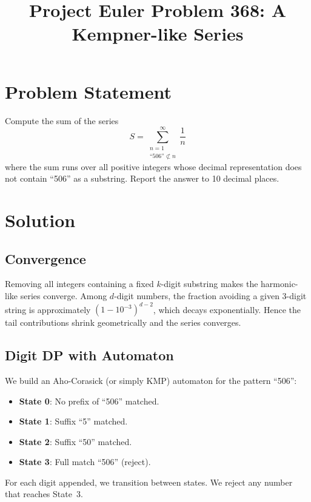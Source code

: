 \documentclass[12pt]{article}
\title{Project Euler Problem 368: A Kempner-like Series}
\author{}
\date{}
\begin{document}
\maketitle

\section{Problem Statement}
Compute the sum of the series
\[
S = \sum_{\substack{n=1 \\ \text{``506''} \not\subset n}}^{\infty} \frac{1}{n}
\]
where the sum runs over all positive integers whose decimal representation does not contain ``506'' as a substring. Report the answer to 10 decimal places.

\section{Solution}

\subsection{Convergence}
Removing all integers containing a fixed $k$-digit substring makes the harmonic-like series converge. Among $d$-digit numbers, the fraction avoiding a given 3-digit string is approximately $(1 - 10^{-3})^{d-2}$, which decays exponentially. Hence the tail contributions shrink geometrically and the series converges.

\subsection{Digit DP with Automaton}
We build an Aho-Corasick (or simply KMP) automaton for the pattern ``506'':
\begin{itemize}
\item \textbf{State 0}: No prefix of ``506'' matched.
\item \textbf{State 1}: Suffix ``5'' matched.
\item \textbf{State 2}: Suffix ``50'' matched.
\item \textbf{State 3}: Full match ``506'' (reject).
\end{itemize}

For each digit appended, we transition between states. We reject any number that reaches State~3.
\end{document}
